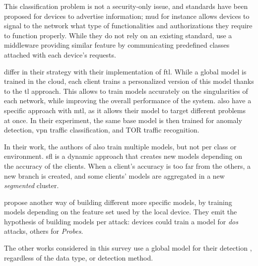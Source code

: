 This classification problem is not a security-only issue, and standards have been proposed for devices to advertise information; \gls{mud} \cite{rfc8520} for instance allows devices to signal to the network what type of functionalities and authorizations they require to function properly.
While they do not rely on an existing standard, \textcite{pahl_AllEyesYou_2018} use a middleware providing similar feature by communicating predefined classes attached with each device's requests.

\textcite{fan_IoTDefenderFederatedTransfer_2020} differ in their strategy with their implementation of \gls{ftl}.
While a global model is trained in the cloud, each client trains a personalized version of this model thanks to the \gls{tl} approach.
This allows to train models accurately on the singularities of each network, while improving the overall performance of the system.
\textcite{zhao_MultiTaskNetworkAnomaly_2019} also have a specific approach with \gls{mtl}, as it allows their model to target different problems at once.
In their experiment, the same base model is then trained for anomaly detection, \gls{vpn} traffic classification, and TOR traffic recognition.

In their work, the authors of \cite{Sun2020,Sun2021} also train multiple models, but not per class or environment.
\Gls{sfl} is a dynamic approach that creates new models depending on the accuracy of the clients.
When a client's accuracy is too far from the others, a new branch is created, and some clients' models are aggregated in a new \emph{segmented} cluster.


\textcite{qin_FederatedLearningBasedNetwork_2021} propose another way of building different more specific models, by training models depending on the feature set used by the local device.
They emit the hypothesis of building models per attack: devices could train a model for \emph{\gls{dos}} attacks, others for \emph{Probes}.

The other works considered in this survey use a global model for their detection \cite{zhang_BlockchainbasedFederatedLearning_2020,schneble_Attackdetectionusing_2019,li_DeepFedFederatedDeep_2020,chen_Networkanomalydetection_2020,rahman_InternetThingsIntrusion_2020,Popoola2021, al-athbaal-marri_FederatedMimicLearning_2020,kim_CollaborativeAnomalyDetection_2020,qin_LineSpeedScalableIntrusion_2020a,chen_Networkanomalydetection_2020b,hei_trustedfeatureaggregator_2020,li_DeepFedFederatedDeep_2020b}, regardless of the data type, or detection method.

